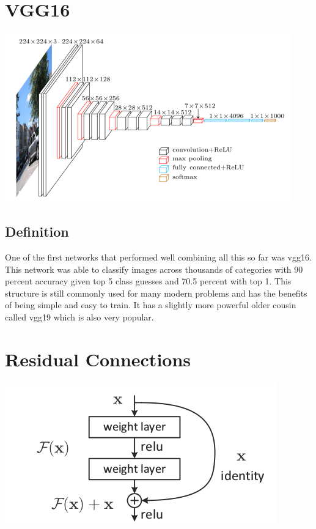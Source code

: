 \documentclass{article}
\begin{document}
\section{VGG16}
\begin{center}
\includegraphics[scale=0.5]{vgg16}
\end{center}
\subsection{Definition}
One of the first networks that performed well combining all this so far was vgg16. This network was able to classify images across thousands of categories with 90 percent accuracy given top 5 class guesses and 70.5 percent with top 1. This structure is still commonly used for many modern problems and has the benefits of being simple and easy to train. It has a slightly more powerful older cousin called vgg19 which is also very popular.

\section{Residual Connections}
\begin{center}
\includegraphics[scale=0.5]{resnet}
\end{center}
\end{document}
